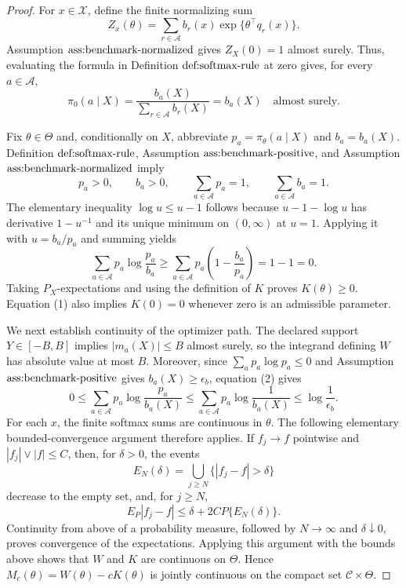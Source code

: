 \documentclass{article}
\begin{document}
\begin{proof}
For \(x\in\mathcal X\), define the finite normalizing sum
\[
 Z_x(\theta)=\sum_{r\in\mathcal A}b_r(x)
                 \exp\{\theta^\top q_r(x)\}.
\]
Assumption \(\textnormal{ass:benchmark-normalized}\) gives \(Z_X(0)=1\) almost surely.  Thus, evaluating the formula in Definition \(\textnormal{def:softmax-rule}\) at zero gives, for every \(a\in\mathcal A\),
\[
 \pi_0(a\mid X)
 =\frac{b_a(X)}{\sum_{r\in\mathcal A}b_r(X)}
 =b_a(X)
 \quad\text{almost surely}.                                      \tag{1}
\]

Fix \(\theta\in\Theta\) and, conditionally on \(X\), abbreviate \(p_a=\pi_\theta(a\mid X)\) and \(b_a=b_a(X)\).  Definition \(\textnormal{def:softmax-rule}\), Assumption \(\textnormal{ass:benchmark-positive}\), and Assumption \(\textnormal{ass:benchmark-normalized}\) imply
\[
 p_a>0,\qquad b_a>0,\qquad \sum_{a\in\mathcal A}p_a=1,
 \qquad \sum_{a\in\mathcal A}b_a=1.
\]
The elementary inequality \(\log u\leq u-1\) follows because \(u-1-\log u\) has derivative \(1-u^{-1}\) and its unique minimum on \((0,\infty)\) at \(u=1\).  Applying it with \(u=b_a/p_a\) and summing yields
\[
 \sum_{a\in\mathcal A}p_a\log\frac{p_a}{b_a}
 \geq \sum_{a\in\mathcal A}p_a\left(1-\frac{b_a}{p_a}\right)
 =1-1=0.                                                        \tag{2}
\]
Taking \(P_X\)-expectations and using the definition of \(K\) proves \(K(\theta)\geq0\).  Equation (1) also implies \(K(0)=0\) whenever zero is an admissible parameter.

We next establish continuity of the optimizer path.  The declared support \(Y\in[-B,B]\) implies \(|m_a(X)|\leq B\) almost surely, so the integrand defining \(W\) has absolute value at most \(B\).  Moreover, since \(\sum_a p_a\log p_a\leq0\) and Assumption \(\textnormal{ass:benchmark-positive}\) gives \(b_a(X)\geq\epsilon_b\), equation (2) gives
\[
 0\leq \sum_{a\in\mathcal A}p_a\log\frac{p_a}{b_a(X)}
 \leq \sum_{a\in\mathcal A}p_a\log\frac{1}{b_a(X)}
 \leq \log\frac{1}{\epsilon_b}.                              \tag{3}
\]
For each \(x\), the finite softmax sums are continuous in \(\theta\).  The following elementary bounded-convergence argument therefore applies.  If \(f_j\to f\) pointwise and \(|f_j|\vee|f|\leq C\), then, for \(\delta>0\), the events
\[
 E_N(\delta)=\bigcup_{j\geq N}\{|f_j-f|>\delta\}
\]
decrease to the empty set, and, for \(j\geq N\),
\[
 E_P|f_j-f|\leq\delta+2C P\{E_N(\delta)\}.
\]
Continuity from above of a probability measure, followed by \(N\to\infty\) and \(\delta\downarrow0\), proves convergence of the expectations.  Applying this argument with the bounds above shows that \(W\) and \(K\) are continuous on \(\Theta\).  Hence \(M_c(\theta)=W(\theta)-cK(\theta)\) is jointly continuous on the compact set \(\mathcal C\times\Theta\).


\end{proof}
\end{document}
